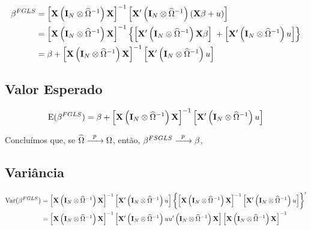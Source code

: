 \documentclass[11pt, oneside, a4paper, article]{article}
\numberwithin{equation}{section}
\begin{document}
\begin{description}
\vspace{-1.5 em}
\begin{align*}
\beta^{FGLS}
&= 
\left[  \mathbf{X} \left( \mathbf{I}_{N} \otimes \widehat{\Omega}^{-1} \right) \mathbf{X} \right]^{-1}
\left[  \mathbf{X}' \left( \mathbf{I}_{N} \otimes \widehat{\Omega}^{-1} \right) (\mathbf{X} \beta + u) \right]
\\
&= 
\left[ \mathbf{X} \left( \mathbf{I}_{N} \otimes \widehat{\Omega}^{-1} \right) \mathbf{X} \right]^{-1}
\left\{ 
\left[ \mathbf{X}' \left( \mathbf{I}_{N} \otimes \widehat{\Omega}^{-1} \right) \mathbf{X} \beta \right]
\; +
\left[ \mathbf{X}' \left( \mathbf{I}_{N} \otimes \widehat{\Omega}^{-1} \right) u \right]
\right\}
\\
&= 
\beta +
\left[ \mathbf{X} \left( \mathbf{I}_{N} \otimes \widehat{\Omega}^{-1} \right) \mathbf{X} \right]^{-1}
\left[ \mathbf{X}' \left( \mathbf{I}_{N} \otimes \widehat{\Omega}^{-1} \right) u \right]
\end{align*}

\subsection{Valor Esperado}

\vspace{-1 em}
\begin{align*}
\text{E}(\beta^{FGLS})
= 
\beta +
\left[ \mathbf{X} \left( \mathbf{I}_{N} \otimes \widehat{\Omega}^{-1} \right) \mathbf{X} \right]^{-1}
\left[ \mathbf{X}' \left( \mathbf{I}_{N} \otimes \widehat{\Omega}^{-1} \right) u \right]
\end{align*}

Concluímos que, se 
$\widehat{\Omega} \xrightarrow{\enskip p \enskip} \Omega$,
então,
$\beta^{FSGLS} \xrightarrow{\enskip p \enskip} \beta$,

\subsection{Variância}

\vspace{-1 em}
\begin{align*}
\text{Var}(\beta^{FGLS})
&= 
\left[ \mathbf{X} \left( \mathbf{I}_{N} \otimes \widehat{\Omega}^{-1} \right) \mathbf{X} \right]^{-1}
\left[ \mathbf{X}' \left( \mathbf{I}_{N} \otimes \widehat{\Omega}^{-1} \right) u \right]
\left\{ 
\left[ \mathbf{X} \left( \mathbf{I}_{N} \otimes \widehat{\Omega}^{-1} \right) \mathbf{X} \right]^{-1}
\left[ \mathbf{X}' \left( \mathbf{I}_{N} \otimes \widehat{\Omega}^{-1} \right) u \right]
\right\}^{\prime}
\\
&=
\left[ \mathbf{X} \left( \mathbf{I}_{N} \otimes \widehat{\Omega}^{-1} \right) \mathbf{X} \right]^{-1}
\left[
\mathbf{X}' \left( \mathbf{I}_{N} \otimes \widehat{\Omega}^{-1} \right) 
u u'
\left( \mathbf{I}_{N} \otimes \widehat{\Omega}^{-1} \right) \mathbf{X}
\right]
\left[ \mathbf{X} \left( \mathbf{I}_{N} \otimes \widehat{\Omega}^{-1} \right) \mathbf{X} \right]^{-1}
\end{align*}


\end{description}
\end{document}
